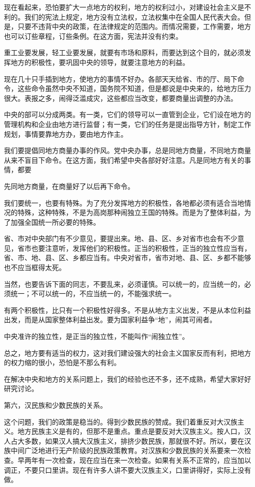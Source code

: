 现在看起来，恐怕要扩大一点地方的权利，地方的权利过小，对建设社会主义是不利的。我们的宪法上规定，地方没有立法权，立法权集中在全国人民代表大会。但是，只要不违背中央的政策，在法律规定的范围内。而情况需要，工作需要，地方也可以订些章程，订些条例。在这方面，宪法并没有约束。

重工业要发展，轻工业要发展，就要有市场和原料，而要达到这个目的，就必须发挥地方的积极性，要巩固中央的领导，就要注意地方的利益。

现在几十只手插到地方，使地方的事情不好办。各部天天给省、市的厅、局下命令，这些命令虽然中央不知道，国务院不知道，但是都说是中央来的，给地方压力很大。表报之多，闹得泛滥成灾，这些都应当改变，都要商量出调整的办法。

中央的部可以分成两类。有一类，它们的领导可以一直管到企业，它们设在地方的管理机构和企业由地方进行监督；有一类，它们的任务是提出指导方针，制定工作规划，事情要靠地方办，要由地方作主。

我们要提倡同地方商量办事的作风。党中央办事，总是同地方商量，不同地方商量从来不盲目下命令。在这方面，我们希望中央各部好好注意。凡是同地方有关的事情，都要

先同地方商量，在商量好了以后再下命令。

我们要统一，也要有特殊。为了充分发挥地方的积极性，各地都必须有适合当地情况的特殊，这种特殊，不是为高岗那种闹独立王国的特殊。而是为了整体利益，为了加强全国统一所必要的特殊。

省、市对中央部门有不少意见，要提出来。地、县、区、乡对省市也会有不少意见，省市也要注意听，发挥他们的积极性。正当的积极性，正当的独立性应当有，省、市、地、县、区、乡都应当有。中央对省市，省市对地、县、区、乡都不能够也不应当框得太死。

当然，也要告诉下面的同志，不要乱来，必须谨慎。可以统一的，应当统一的，必须统一；不可以统一的，不应当统一的，不能强求统一。

有两个积极性，比只有一个积极性好得多。不是从地方主义出发，不是从本位利益出发，而是从国家整体利益出发。要为国家利益争“地”，闹其可闹者。

中央准许的独立性，是正当的独立性，不能叫作“闹独立性”。

总之，地方要有适当的权力，这对我们建设强大的社会主义国家反而有利，把地方的权力缩的很小，恐怕是不那么有利。

在解决中央和地方的关系问题上，我们的经验也还不多，还不成熟，希望大家好好研究讨论。

第六，汉民族和少数民族的关系。

这个问题，我们的政策是稳当的。得到少数民族的赞成。我们着重反对大汉族主义。地方民族主义是有的，但那不是重点。重点是要反对大汉族主义。按人口，汉人占大多数，如果汉人搞大汉族主义，排挤少数民族，那就很不好。所以，要在汉族中间广泛地进行无产阶级的民族政策教育。对汉族和少数民族的关系要来一次检查。早两年有一次检查，现在应当在来一次检查。如果有关系不正常的，应当加以调正，不要只口里讲。现在有许多人讲不要大汉族主义，口里讲得好，实际上没有做。

